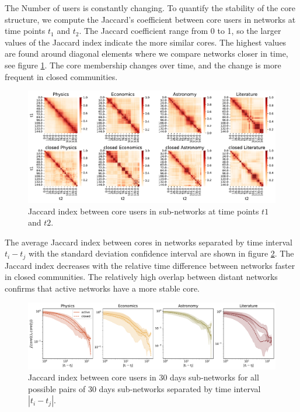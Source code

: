 The Number of users is constantly changing. To quantify the stability of the core structure, we compute the Jaccard’s coefficient between core users in networks at time points $t_1$ and $t_2$. The Jaccard coefficient range from 0 to 1, so the larger values of the Jaccard index indicate the more similar cores. 
The highest values are found around diagonal elements where we compare networks closer in time, see figure \ref{fig:jaccard_hm}. The core membership changes over time, and the change is more frequent in closed communities. 

\begin{figure}[h!]
	\centering
	\includegraphics[width=\linewidth]{figures/stackexchange/jaccard_heatmap.pdf}
	\caption[Mean Jaccard index between core users.]{Jaccard index between core users in  sub-networks at time points $t1$ and $t2$.}
	\label{fig:jaccard_hm}
\end{figure}  

The average Jaccard index between cores in networks separated by time interval $t_i-t_j$ with the standard deviation confidence interval are shown in figure \ref{fig:jaccard_mean}. The Jaccard index decreases with the relative time difference between networks faster in closed communities. The relatively high overlap between distant networks confirms that active networks have a more stable core. 

\begin{figure}[h!]
	\centering
	\includegraphics[width=\linewidth]{figures/stackexchange/jaccard.pdf}
	\caption[Mean Jaccard index between core users.]{Jaccard index between core users in 30 days sub-networks for all possible pairs of 30 days sub-networks separated by time interval $|t_i - t_j|$.}
	\label{fig:jaccard_mean}
\end{figure}


